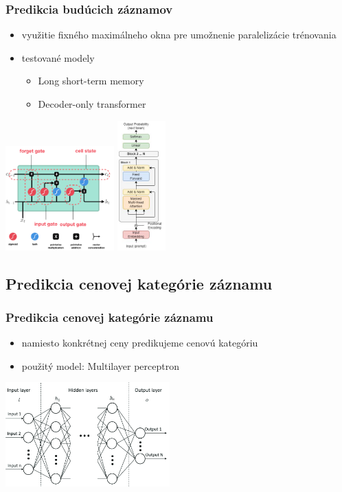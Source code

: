 \documentclass[slovak]{beamer}
\begin{document}
\begin{frame}
	\frametitle{Predikcia budúcich záznamov}
	\begin{itemize}
		\item<1> využitie fixného maximálneho okna pre umožnenie paralelizácie trénovania
		\item<1> testované modely
		 \begin{itemize}
		 	\item<1> Long short-term memory
		 	\item<1> Decoder-only transformer
		 \end{itemize}
	\end{itemize}
	\begin{center}
		\includegraphics[height=4cm]{images/LSTM_arch.png}
		\includegraphics[height=5cm]{images/decod_only_trans_arch.png}
	\end{center}
\end{frame}

\subsection{Predikcia cenovej kategórie záznamu}

\begin{frame}
	\frametitle{Predikcia cenovej kategórie záznamu}
	\begin{itemize}
		\item<1> namiesto konkrétnej ceny predikujeme cenovú kategóriu
		\item<1> použitý model: Multilayer perceptron
	\end{itemize}
	\begin{center}
		\includegraphics[height=4cm]{images/MLP_arch.png}
	\end{center}
\end{frame}
\end{document}
